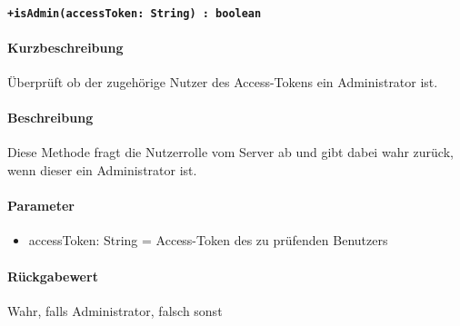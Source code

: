 \paragraph{\texttt{+isAdmin(accessToken: String) : boolean}}%
\paragraph*{Kurzbeschreibung}
Überprüft ob der zugehörige Nutzer des Access-Tokens ein Administrator ist.
\paragraph*{Beschreibung}
Diese Methode fragt die Nutzerrolle vom Server ab und gibt dabei wahr zurück, wenn dieser ein Administrator ist.
\paragraph*{Parameter}
\begin{itemize}
    \item accessToken: String = Access-Token des zu prüfenden Benutzers
\end{itemize}
\paragraph*{Rückgabewert}
Wahr, falls Administrator, falsch sonst